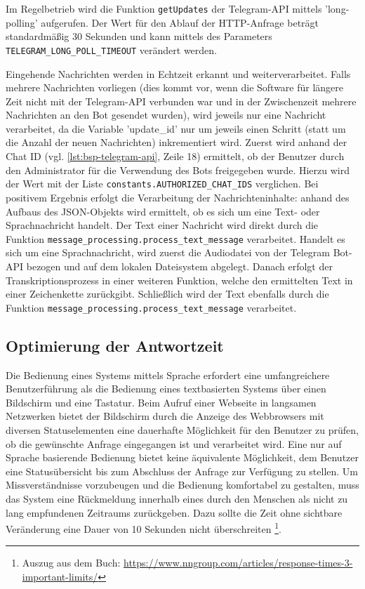 Im Regelbetrieb wird die Funktion \lstinline{getUpdates} der Telegram-API mittels 'long-polling' aufgerufen. Der Wert für den Ablauf der HTTP-Anfrage beträgt standardmäßig 30 Sekunden und kann mittels des Parameters \lstinline{TELEGRAM_LONG_POLL_TIMEOUT} verändert werden.

Eingehende Nachrichten werden in Echtzeit erkannt und weiterverarbeitet. Falls mehrere Nachrichten vorliegen (dies kommt vor, wenn die Software für längere Zeit nicht mit der Telegram-API verbunden war und in der Zwischenzeit mehrere Nachrichten an den Bot gesendet wurden), wird jeweils nur eine Nachricht verarbeitet, da die Variable 'update\_id' nur um jeweils einen Schritt (statt um die Anzahl der neuen Nachrichten) inkrementiert wird. Zuerst wird anhand der Chat ID (vgl. \autoref{lst:bsp-telegram-api}, Zeile 18) ermittelt, ob der Benutzer durch den Administrator für die Verwendung des Bots freigegeben wurde. Hierzu wird der Wert mit der Liste \lstinline{constants.AUTHORIZED_CHAT_IDS} verglichen. Bei positivem Ergebnis erfolgt die Verarbeitung der Nachrichteninhalte: anhand des Aufbaus des JSON-Objekts wird ermittelt, ob es sich um eine Text- oder Sprachnachricht handelt. Der Text einer Nachricht wird direkt durch die Funktion \lstinline{message_processing.process_text_message} verarbeitet. Handelt es sich um eine Sprachnachricht, wird zuerst die Audiodatei von der Telegram Bot-API bezogen und auf dem lokalen Dateisystem abgelegt. Danach erfolgt der Transkriptionsprozess in einer weiteren Funktion, welche den ermittelten Text in einer Zeichenkette zurückgibt. Schließlich wird der Text ebenfalls durch die Funktion \lstinline{message_processing.process_text_message} verarbeitet.

\subsection{Optimierung der Antwortzeit}

Die Bedienung eines Systems mittels Sprache erfordert eine umfangreichere Benutzerführung als die Bedienung eines textbasierten Systems über einen Bildschirm und eine Tastatur. Beim Aufruf einer Webseite in langsamen Netzwerken bietet der Bildschirm durch die Anzeige des Webbrowsers mit diversen Statuselementen eine dauerhafte Möglichkeit für den Benutzer zu prüfen, ob die gewünschte Anfrage eingegangen ist und verarbeitet wird. Eine nur auf Sprache basierende Bedienung bietet keine äquivalente Möglichkeit, dem Benutzer eine Statusübersicht bis zum Abschluss der Anfrage zur Verfügung zu stellen. Um Missverständnisse vorzubeugen und die Bedienung komfortabel zu gestalten, muss das System eine Rückmeldung innerhalb eines durch den Menschen als nicht zu lang empfundenen Zeitraums zurückgeben. Dazu sollte die Zeit ohne sichtbare Veränderung eine Dauer von 10 Sekunden nicht überschreiten \cite[Kapitel 5.5]{response-time}\footnote{Auszug aus dem Buch: \url{https://www.nngroup.com/articles/response-times-3-important-limits/}}. 

